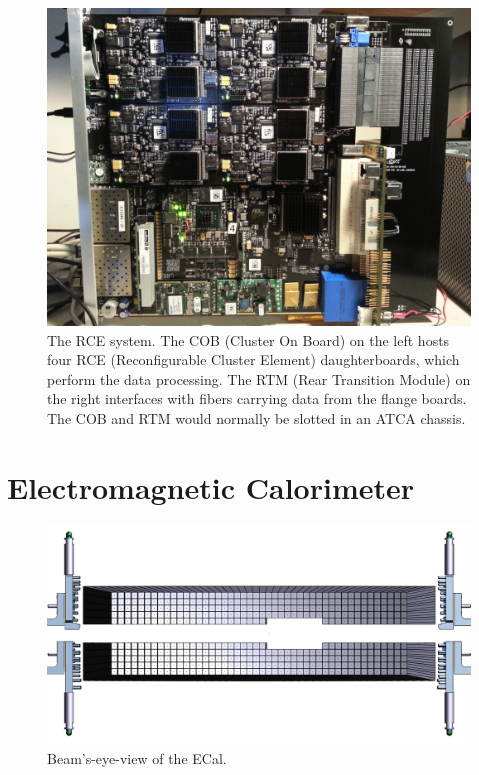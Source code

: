 \begin{figure}[ht]
    \includegraphics[width=\textwidth]{detector/figs/rce}
    \caption{The RCE system. The COB (Cluster On Board) on the left hosts four RCE (Reconfigurable Cluster Element) daughterboards, which perform the data processing. The RTM (Rear Transition Module) on the right interfaces with fibers carrying data from the flange boards. The COB and RTM would normally be slotted in an ATCA chassis.}
    \label{figure:svt_layout}
\end{figure}


\section{Electromagnetic Calorimeter}
\begin{figure}[ht]
    \includegraphics[width=\textwidth]{detector/figs/ECal}
    \caption{Beam's-eye-view of the ECal.}
    \label{figure:svt_layout}
\end{figure}

